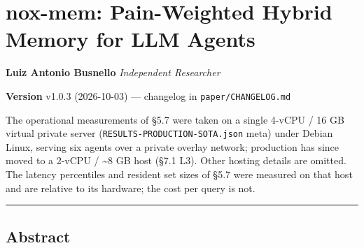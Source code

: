 \documentclass[
]{article}
\author{}
\date{}
\begin{document}
\section{nox-mem: Pain-Weighted Hybrid Memory for LLM
Agents}\label{nox-mem-pain-weighted-hybrid-memory-for-llm-agents}

\textbf{Luiz Antonio Busnello} \emph{Independent Researcher}

\textbf{Version} v1.0.3 (2026-10-03) --- changelog in
\texttt{paper/CHANGELOG.md}

The operational measurements of §5.7 were taken on a single 4-vCPU / 16
GB virtual private server (\texttt{RESULTS-PRODUCTION-SOTA.json} meta)
under Debian Linux, serving six agents over a private overlay network;
production has since moved to a 2-vCPU / \textasciitilde8 GB host (§7.1
L3). Other hosting details are omitted. The latency percentiles and
resident set sizes of §5.7 were measured on that host and are relative
to its hardware; the cost per query is not.

\begin{center}\rule{0.5\linewidth}{0.5pt}\end{center}

\subsection{Abstract}\label{abstract}
\end{document}
